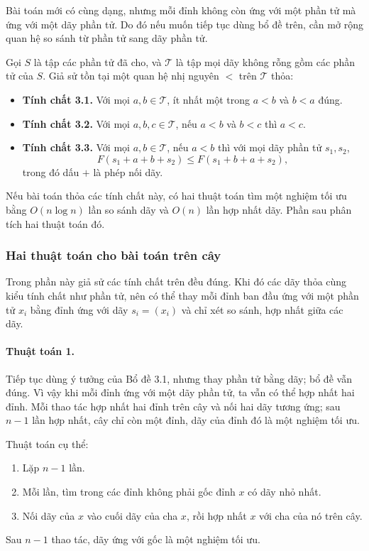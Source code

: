 \documentclass[11pt]{article}
\begin{document}
Bài toán mới có cùng dạng, nhưng mỗi đỉnh không còn ứng với một phần tử mà ứng
với một dãy phần tử. Do đó nếu muốn tiếp tục dùng bổ đề trên, cần mở rộng quan
hệ so sánh từ phần tử sang dãy phần tử.

Gọi $S$ là tập các phần tử đã cho, và $\mathcal T$ là tập mọi dãy không rỗng
gồm các phần tử của $S$. Giả sử tồn tại một quan hệ nhị nguyên $<$ trên
$\mathcal T$ thỏa:
\begin{itemize}
  \item \textbf{Tính chất 3.1.} Với mọi $a,b\in\mathcal T$, ít nhất một trong
  $a<b$ và $b<a$ đúng.
  \item \textbf{Tính chất 3.2.} Với mọi $a,b,c\in\mathcal T$, nếu $a<b$ và
  $b<c$ thì $a<c$.
  \item \textbf{Tính chất 3.3.} Với mọi $a,b\in\mathcal T$, nếu $a<b$ thì với
  mọi dãy phần tử $s_1,s_2$,
  \[
    F(s_1+a+b+s_2)\le F(s_1+b+a+s_2),
  \]
  trong đó dấu $+$ là phép nối dãy.
\end{itemize}

Nếu bài toán thỏa các tính chất này, có hai thuật toán tìm một nghiệm tối ưu
bằng $O(n\log n)$ lần so sánh dãy và $O(n)$ lần hợp nhất dãy. Phần sau phân tích
hai thuật toán đó.

\subsubsection{Hai thuật toán cho bài toán trên cây}

Trong phần này giả sử các tính chất trên đều đúng. Khi đó các dãy thỏa cùng
kiểu tính chất như phần tử, nên có thể thay mỗi đỉnh ban đầu ứng với một phần
tử $x_i$ bằng đỉnh ứng với dãy $s_i=(x_i)$ và chỉ xét so sánh, hợp nhất giữa các
dãy.

\paragraph{Thuật toán 1.}
Tiếp tục dùng ý tưởng của Bổ đề 3.1, nhưng thay phần tử bằng dãy; bổ đề vẫn
đúng. Vì vậy khi mỗi đỉnh ứng với một dãy phần tử, ta vẫn có thể hợp nhất hai
đỉnh. Mỗi thao tác hợp nhất hai đỉnh trên cây và nối hai dãy tương ứng; sau
$n-1$ lần hợp nhất, cây chỉ còn một đỉnh, dãy của đỉnh đó là một nghiệm tối ưu.

Thuật toán cụ thể:
\begin{enumerate}
  \item Lặp $n-1$ lần.
  \item Mỗi lần, tìm trong các đỉnh không phải gốc đỉnh $x$ có dãy nhỏ nhất.
  \item Nối dãy của $x$ vào cuối dãy của cha $x$, rồi hợp nhất $x$ với cha của
  nó trên cây.
\end{enumerate}
Sau $n-1$ thao tác, dãy ứng với gốc là một nghiệm tối ưu.
\end{document}
